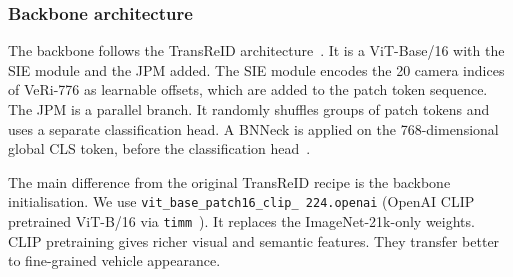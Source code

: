 \subsubsection{Backbone architecture}
The backbone follows the TransReID architecture~\cite{he2021transreid}. It is a ViT-Base/16 with the SIE module and the JPM added. The SIE module encodes the 20 camera indices of VeRi-776 as learnable offsets, which are added to the patch token sequence. The JPM is a parallel branch. It randomly shuffles groups of patch tokens and uses a separate classification head. A BNNeck is applied on the 768-dimensional global CLS token, before the classification head~\cite{he2021transreid}.

The main difference from the original TransReID recipe is the backbone initialisation. We use \texttt{vit\_base\_\allowbreak patch16\_\allowbreak clip\_\allowbreak
224.openai} (OpenAI CLIP pretrained ViT-B/16 via
\texttt{timm}~\cite{radford2021clip}). It replaces the ImageNet-21k-only weights. CLIP pretraining gives richer visual and semantic features. They transfer better to fine-grained vehicle appearance.
